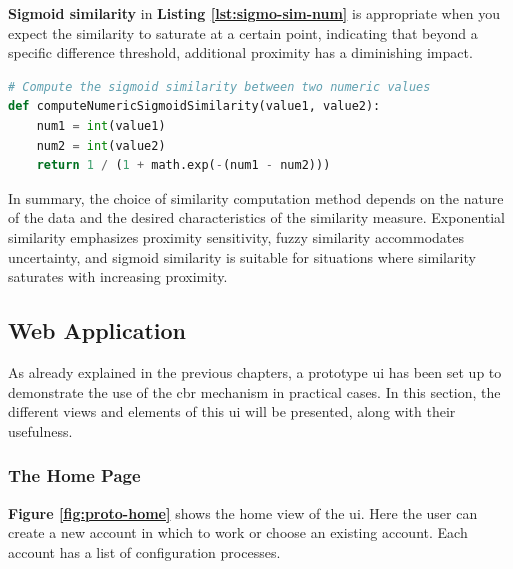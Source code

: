     
    \textbf{Sigmoid similarity} in \textbf{Listing \ref{lst:sigmo-sim-num}} is appropriate when you expect the similarity to saturate at a certain point, indicating that beyond a specific difference threshold, additional proximity has a diminishing impact.\\

\begin{lstlisting}[language=Python, caption=Function to Compute the Similarity Value Between Two Numerics using the Sigmoid Function, label={lst:sigmo-sim-num}]
# Compute the sigmoid similarity between two numeric values
def computeNumericSigmoidSimilarity(value1, value2):
    num1 = int(value1)
    num2 = int(value2)
    return 1 / (1 + math.exp(-(num1 - num2)))
\end{lstlisting}
        
In summary, the choice of similarity computation method depends on the nature of the data and the desired characteristics of the similarity measure. Exponential similarity emphasizes proximity sensitivity, fuzzy similarity accommodates uncertainty, and sigmoid similarity is suitable for situations where similarity saturates with increasing proximity.

\subsection{Web Application}
As already explained in the previous chapters, a prototype \acrshort{ui} has been set up to demonstrate the use of the \acrshort{cbr} mechanism in practical cases. In this section, the different views and elements of this \acrshort{ui} will be presented, along with their usefulness.

    \subsubsection{The Home Page}
    \textbf{Figure \ref{fig:proto-home}} shows the home view of the \acrshort{ui}. Here the user can create a new account in which to work or choose an existing account. Each account has a list of configuration processes.
    
